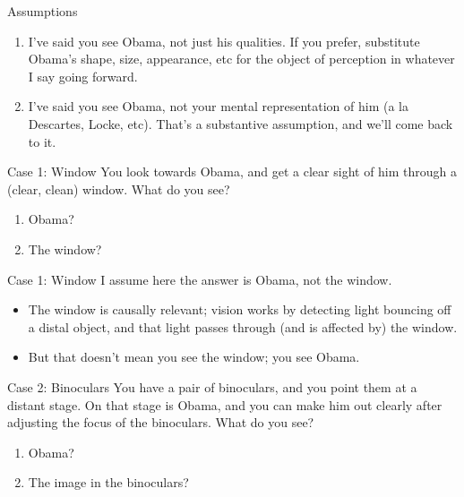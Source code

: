 \documentclass[
  17pt,
  letterpaper,
  ignorenonframetext,
  aspectratio=169,
]{beamer}
\providecommand{\tightlist}{%
  \setlength{\itemsep}{0pt}\setlength{\parskip}{0pt}}\usepackage{longtable,booktabs,array}
\begin{document}
\begin{frame}{Assumptions}
\protect\hypertarget{assumptions}{}
\begin{enumerate}[<+->]
\tightlist
\item
  I've said you see Obama, not just his qualities. If you prefer,
  substitute Obama's shape, size, appearance, etc for the object of
  perception in whatever I say going forward.
\item
  I've said you see Obama, not your mental representation of him (a la
  Descartes, Locke, etc). That's a substantive assumption, and we'll
  come back to it.
\end{enumerate}
\end{frame}

\begin{frame}{Case 1: Window}
\protect\hypertarget{case-1-window}{}
You look towards Obama, and get a clear sight of him through a (clear,
clean) window. What do you see?

\begin{enumerate}[<+->]
\tightlist
\item
  Obama?
\item
  The window?
\end{enumerate}
\end{frame}

\begin{frame}{Case 1: Window}
\protect\hypertarget{case-1-window-1}{}
I assume here the answer is Obama, not the window.

\begin{itemize}[<+->]
\tightlist
\item
  The window is causally relevant; vision works by detecting light
  bouncing off a distal object, and that light passes through (and is
  affected by) the window.
\item
  But that doesn't mean you see the window; you see Obama.
\end{itemize}
\end{frame}

\begin{frame}{Case 2: Binoculars}
\protect\hypertarget{case-2-binoculars}{}
You have a pair of binoculars, and you point them at a distant stage. On
that stage is Obama, and you can make him out clearly after adjusting
the focus of the binoculars. What do you see?

\begin{enumerate}[<+->]
\tightlist
\item
  Obama?
\item
  The image in the binoculars?
\end{enumerate}
\end{frame}
\end{document}
